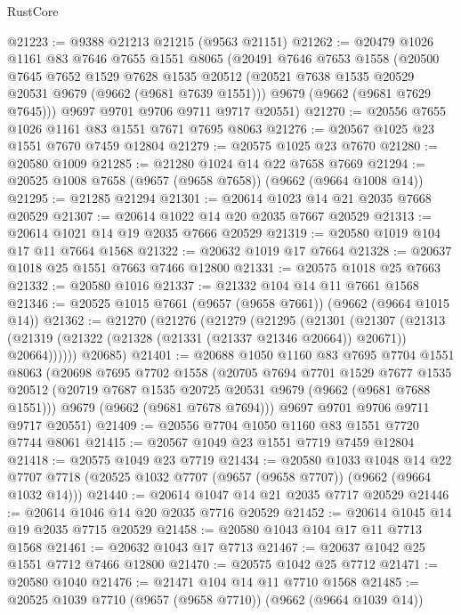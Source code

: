 \begin{lexlean}{RustCore}
\begin{coremodule}
@21223 := @9388 @21213 @21215 (@9563 @21151)
@21262 := @20479
    @1026
    @1161
    @83
    @7646
    @7655
    @1551
    @8065
    (@20491
      @7646
      @7653
      @1558
      (@20500
        @7645
        @7652
        @1529
        @7628
        @1535
        @20512
        (@20521 @7638 @1535 @20529 @20531 @9679 (@9662 (@9681 @7639 @1551)))
        @9679
        (@9662 (@9681 @7629 @7645)))
      @9697
      @9701
      @9706
      @9711
      @9717
      @20551)
@21270 := @20556 @7655 @1026 @1161 @83 @1551 @7671 @7695 @8063
@21276 := @20567 @1025 @23 @1551 @7670 @7459 @12804
@21279 := @20575 @1025 @23 @7670
@21280 := @20580 @1009
@21285 := @21280 @1024 @14 @22 @7658 @7669
@21294 := @20525 @1008 @7658 (@9657 (@9658 @7658)) (@9662 (@9664 @1008 @14))
@21295 := @21285 @21294
@21301 := @20614 @1023 @14 @21 @2035 @7668 @20529
@21307 := @20614 @1022 @14 @20 @2035 @7667 @20529
@21313 := @20614 @1021 @14 @19 @2035 @7666 @20529
@21319 := @20580 @1019 @104 @17 @11 @7664 @1568
@21322 := @20632 @1019 @17 @7664
@21328 := @20637 @1018 @25 @1551 @7663 @7466 @12800
@21331 := @20575 @1018 @25 @7663
@21332 := @20580 @1016
@21337 := @21332 @104 @14 @11 @7661 @1568
@21346 := @20525 @1015 @7661 (@9657 (@9658 @7661)) (@9662 (@9664 @1015 @14))
@21362 := @21270
    (@21276
      (@21279
        (@21295
          (@21301
            (@21307
              (@21313 (@21319 (@21322 (@21328 (@21331 (@21337 @21346 @20664)) @20671)) @20664))))))
      @20685)
@21401 := @20688
    @1050
    @1160
    @83
    @7695
    @7704
    @1551
    @8063
    (@20698
      @7695
      @7702
      @1558
      (@20705
        @7694
        @7701
        @1529
        @7677
        @1535
        @20512
        (@20719 @7687 @1535 @20725 @20531 @9679 (@9662 (@9681 @7688 @1551)))
        @9679
        (@9662 (@9681 @7678 @7694)))
      @9697
      @9701
      @9706
      @9711
      @9717
      @20551)
@21409 := @20556 @7704 @1050 @1160 @83 @1551 @7720 @7744 @8061
@21415 := @20567 @1049 @23 @1551 @7719 @7459 @12804
@21418 := @20575 @1049 @23 @7719
@21434 := @20580
    @1033
    @1048
    @14
    @22
    @7707
    @7718
    (@20525 @1032 @7707 (@9657 (@9658 @7707)) (@9662 (@9664 @1032 @14)))
@21440 := @20614 @1047 @14 @21 @2035 @7717 @20529
@21446 := @20614 @1046 @14 @20 @2035 @7716 @20529
@21452 := @20614 @1045 @14 @19 @2035 @7715 @20529
@21458 := @20580 @1043 @104 @17 @11 @7713 @1568
@21461 := @20632 @1043 @17 @7713
@21467 := @20637 @1042 @25 @1551 @7712 @7466 @12800
@21470 := @20575 @1042 @25 @7712
@21471 := @20580 @1040
@21476 := @21471 @104 @14 @11 @7710 @1568
@21485 := @20525 @1039 @7710 (@9657 (@9658 @7710)) (@9662 (@9664 @1039 @14))

\end{coremodule}
\end{lexlean}
